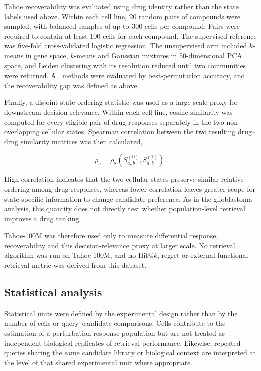 \documentclass[11pt,letterpaper]{article}
\begin{document}
Tahoe recoverability was evaluated using drug identity rather than the state labels used above.
Within each cell line, 20 random pairs of compounds were sampled, with balanced samples of up to
300 cells per compound. Pairs were required to contain at least 100 cells for each compound.
The supervised reference was five-fold cross-validated logistic regression. The unsupervised arm
included $k$-means in gene space, $k$-means and Gaussian mixtures in 50-dimensional PCA space, and
Leiden clustering with its resolution reduced until two communities were returned. All methods
were evaluated by best-permutation accuracy, and the recoverability gap was defined as above.

Finally, a disjoint state-ordering statistic was used as a large-scale proxy for downstream
decision relevance. Within each cell line, cosine similarity was computed for every eligible pair
of drug responses separately in the two non-overlapping cellular states. Spearman correlation
between the two resulting drug--drug similarity matrices was then calculated,

$$
\rho_c
=
\rho_{\mathrm{S}}
\left(
S^{(0)}_{a,b},
S^{(1)}_{a,b}
\right).
$$

High correlation indicates that the two cellular states preserve similar relative ordering among
drug responses, whereas lower correlation leaves greater scope for state-specific information to
change candidate preference. As in the glioblastoma analysis, this quantity does not directly test
whether population-level retrieval improves a drug ranking.

Tahoe-100M was therefore used only to measure differential response, recoverability and this
decision-relevance proxy at larger scale. No retrieval algorithm was run on Tahoe-100M, and no
Hit@$k$, regret or external functional retrieval metric was derived from this dataset.




\subsection*{Statistical analysis}

Statistical units were defined by the experimental design rather than by the number of cells or
query--candidate comparisons. Cells contribute to the estimation of a perturbation-response
population but are not treated as independent biological replicates of retrieval performance\cite{PseudoRep}.
Likewise, repeated queries sharing the same candidate library or biological context are interpreted
at the level of that shared experimental unit where appropriate.
\end{document}
